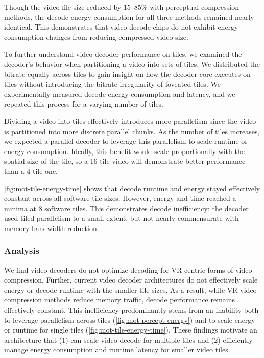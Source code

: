 Though the video file size reduced by 15--85\% with perceptual compression methods, the decode energy consumption for all three methods remained nearly identical.
This demonstrates that video decode chips do not exhibit energy consumption changes from reducing compressed video size.

To further understand video decoder performance on tiles, we examined the decoder's behavior when partitioning a video into sets of tiles.
We distributed the bitrate equally across tiles to gain insight on how the decoder core executes on tiles without introducing the  bitrate irregularity of foveated tiles.
We experimentally measured decode energy consumption and latency, and we repeated this process for a varying number of tiles.

Dividing a video into tiles effectively introduces more parallelism since the video is partitioned into more discrete parallel chunks.
As the number of tiles increases, we expected a parallel decoder to leverage this parallelism to scale runtime or energy consumption.
Ideally, this benefit would scale proportionally with the spatial size of the tile, so a 16-tile video will demonstrate better performance than a 4-tile one.

\ref{fig:mot-tile-energy-time} shows that decode runtime and energy stayed effectively constant across all software tile sizes.
However, energy and time reached a minima at 8 software tiles.
This demonstrates decode inefficiency: the decoder used tiled parallelism to a small extent, but not nearly commensurate with memory bandwidth reduction.

\subsubsection{Analysis}
We find video decoders do not optimize decoding for VR-centric forms of video compression.
Further, current video decoder architectures do not effectively scale energy or decode runtime with the smaller tile sizes.
As a result, while VR video compression methods reduce memory traffic, decode performance remains effectively constant.
This inefficiency predominantly stems from an inability both to leverage parallelism across tiles (\ref{fig:mot-percept-energy}) and to scale energy or runtime for single tiles (\ref{fig:mot-tile-energy-time}).
These findings motivate an architecture that (1) can scale video decode for multiple tiles and (2) efficiently manage energy consumption and runtime latency for smaller video tiles.
